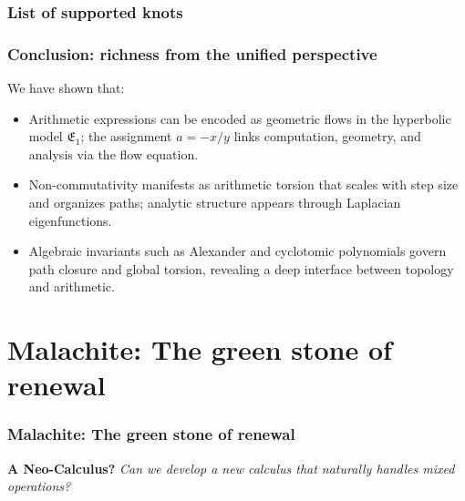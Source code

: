 \documentclass[aspectratio=169]{beamer}
\begin{document}
\begin{frame}
    \frametitle{List of supported knots}

\end{frame}

\begin{frame}
    \frametitle{Conclusion: richness from the unified perspective}
    We have shown that:
    \begin{itemize}
        \item Arithmetic expressions can be encoded as geometric flows in the hyperbolic model $\mathfrak{E}_1$; the assignment $a=-x/y$ links computation, geometry, and analysis via the flow equation.
        \item Non-commutativity manifests as arithmetic torsion that scales with step size and organizes paths; analytic structure appears through Laplacian eigenfunctions.
        \item Algebraic invariants such as Alexander and cyclotomic polynomials govern path closure and global torsion, revealing a deep interface between topology and arithmetic.
    \end{itemize}
\end{frame}


\section{Malachite: The green stone of renewal}

\begin{frame}
    \frametitle{Malachite: The green stone of renewal}
    \begin{center}
        \Large
        \textbf{A Neo-Calculus?}\newline\newline
        \emph{Can we develop a new calculus that naturally handles mixed operations?}
    \end{center}
\end{frame}
\end{document}
